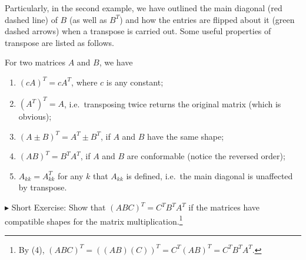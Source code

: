 Particularly, in the second example, we have outlined the main diagonal (red dashed line) of $B$ (as well as $B^T$) and how the entries are flipped about it (green dashed arrows) when a transpose is carried out. Some useful properties of transpose are listed as follows.
\begin{proper}
\label{proper:transp}
For two matrices $A$ and $B$, we have
\begin{enumerate}
\item $(cA)^T = cA^T$, where $c$ is any constant;
\item $(A^T)^T = A$, i.e.\ transposing twice returns the original matrix (which is obvious);
\item $(A \pm B)^T = A^T \pm B^T$, if $A$ and $B$ have the same shape;
\item $(AB)^T = B^TA^T$, if $A$ and $B$ are conformable (notice the reversed order);
\item $A_{kk} = A^T_{kk}$ for any $k$ that $A_{kk}$ is defined, i.e.\ the main diagonal is unaffected by transpose.
\end{enumerate}
\end{proper}
$\blacktriangleright$ Short Exercise: Show that $(ABC)^T = C^TB^TA^T$ if the matrices have compatible shapes for the matrix multiplication.\footnote{By (4), $(ABC)^T = ((AB)(C))^T = C^T(AB)^T = C^TB^TA^T$.}

